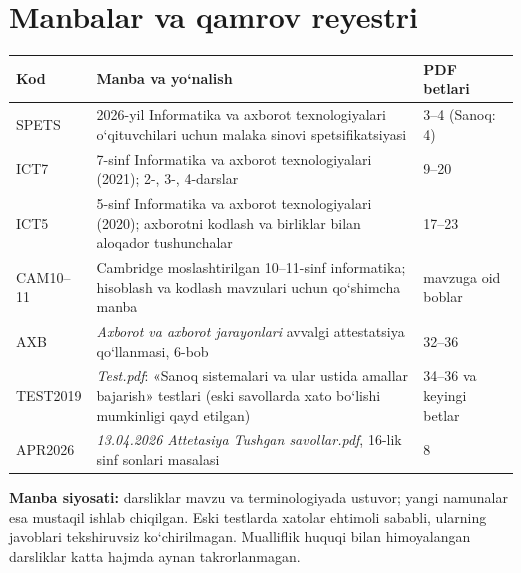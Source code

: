 \documentclass[11pt,a4paper,openany,oneside]{book}
\begin{document}
\appendix
\chapter{Manbalar va qamrov reyestri}
\begin{center}\small\renewcommand{\arraystretch}{1.18}\begin{tabularx}{\textwidth}{@{}p{21mm}X p{34mm}@{}}\toprule
Kod & Manba va yo‘nalish & PDF betlari \\ \midrule
SPETS & 2026-yil Informatika va axborot texnologiyalari o‘qituvchilari uchun malaka sinovi spetsifikatsiyasi & 3–4 (Sanoq: 4) \\
ICT7 & 7-sinf Informatika va axborot texnologiyalari (2021); 2-, 3-, 4-darslar & 9–20 \\
ICT5 & 5-sinf Informatika va axborot texnologiyalari (2020); axborotni kodlash va birliklar bilan aloqador tushunchalar & 17–23 \\
CAM10–11 & Cambridge moslashtirilgan 10–11-sinf informatika; hisoblash va kodlash mavzulari uchun qo‘shimcha manba & mavzuga oid boblar \\
AXB & \emph{Axborot va axborot jarayonlari} avvalgi attestatsiya qo‘llanmasi, 6-bob & 32–36 \\
TEST2019 & \emph{Test.pdf}: «Sanoq sistemalari va ular ustida amallar bajarish» testlari (eski savollarda xato bo‘lishi mumkinligi qayd etilgan) & 34–36 va keyingi betlar \\
APR2026 & \emph{13.04.2026 Attetasiya Tushgan savollar.pdf}, 16-lik sinf sonlari masalasi & 8 \\
\bottomrule\end{tabularx}\end{center}
\textbf{Manba siyosati:} darsliklar mavzu va terminologiyada ustuvor; yangi namunalar esa mustaqil ishlab chiqilgan. Eski testlarda xatolar ehtimoli sababli, ularning javoblari tekshiruvsiz ko‘chirilmagan. Mualliflik huquqi bilan himoyalangan darsliklar katta hajmda aynan takrorlanmagan.
\end{document}
